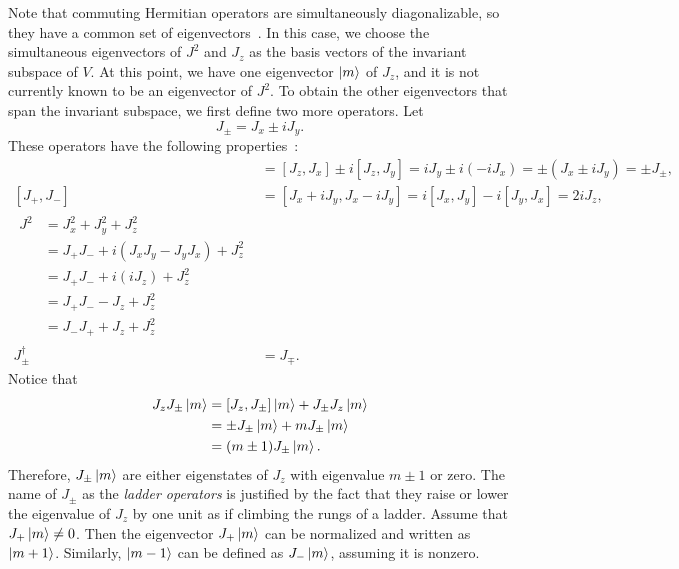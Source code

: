 Note that commuting Hermitian operators are simultaneously diagonalizable, so they have a common set of eigenvectors~\cite{Zwiebach2022}. In this case, we choose the simultaneous eigenvectors of $J^2$ and $J_z$ as the basis vectors of the invariant subspace of $V$. At this point, we have one eigenvector $\ket{m}$ of $J_z$, and it is not currently known to be an eigenvector of $J^2$. To obtain the other eigenvectors that span the invariant subspace, we first define two more operators. Let
\begin{equation}
    J_\pm = J_x \pm i J_y.
\end{equation}
These operators have the following properties~\cite{Tung1985,Griffiths2018,Hall2013}:
\begin{align}
    [J_z, J_\pm] &= [J_z, J_x] \pm i[J_z, J_y] = i J_y \pm i(-i J_x) = \pm(J_x \pm iJ_y) = \pm J_\pm, \\
    [J_+, J_-] &= [J_x + i J_y, J_x - i J_y] = i[J_x, J_y] - i[J_y, J_x] = 2i J_z, \\
    \begin{split}
    J^2 
        &=  J_x^2 + J_y^2 + J_z^2 \\
        &=  J_+ J_- + i(J_x J_y - J_y J_x) + J_z^2 \\
        &=  J_+ J_- + i(i J_z) + J_z^2 \\
        &= J_+ J_- - J_z + J_z^2 \\
        &= J_- J_+ + J_z + J_z^2
    \end{split}\\
    J_\pm^\dagger &= J_\mp.
\end{align}
Notice that
\begin{align}
    \begin{split}        
    J_z J_\pm\ket{m} &= [J_z,J_\pm]\ket{m} + J_\pm J_z\ket{m} \\
    &= \pm J_\pm\ket{m} + m J_\pm\ket{m} \\
    &= (m\pm 1)J_\pm\ket{m}.
    \end{split}
\end{align}
Therefore, $J_\pm\ket{m}$ are either eigenstates of $J_z$ with eigenvalue $m\pm 1$ or zero. The name of $J_\pm$ as the \textit{ladder operators} is justified by the fact that they raise or lower the eigenvalue of $J_z$ by one unit as if climbing the rungs of a ladder. Assume that $J_+\ket{m}\neq 0$. Then the eigenvector $J_+\ket{m}$ can be normalized and written as $\ket{m+1}$. Similarly, $\ket{m-1}$ can be defined as $J_-\ket{m}$, assuming it is nonzero.

